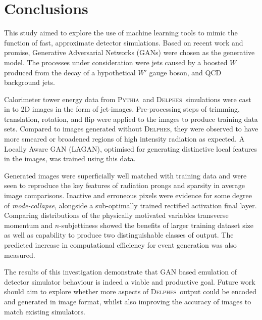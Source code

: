 \documentclass{report}
\newcommand{\pkg}[1]{\textsc{#1}}
\newcommand{\pythia}{\pkg{Pythia}}
\newcommand{\delphes}{\pkg{Delphes}}
\begin{document}
\chapter{Conclusions}
\label{sec:conclusions}
This study aimed to explore the use of machine learning tools to mimic the function of fast, approximate detector simulations. Based on recent work and promise, Generative Adversarial Networks (GANs) were chosen as the generative model. The processes under consideration were jets caused by a boosted $W$ produced from the decay of a hypothetical $W'$ gauge boson, and QCD background jets. 

Calorimeter tower energy data from \pythia~and \delphes~simulations were cast in to 2D images in the form of jet-images. Pre-processing steps of trimming, translation, rotation, and flip were applied to the images to produce training data sets. Compared to images generated without \delphes, they were observed to have more smeared or broadened regions of high intensity radiation as expected. A Locally Aware GAN (LAGAN), optimised for generating distinctive local features in the images, was trained using this data. 

Generated images were superficially well matched with training data and were seen to reproduce the key features of radiation prongs and sparsity in average image comparisons. Inactive and erroneous pixels were evidence for some degree of \textit{mode-collapse}, alongside a sub-optimally trained rectified activation final layer. Comparing distributions of the physically motivated variables transverse momentum and $n$-subjettiness showed the benefits of larger training dataset size as well as capability to produce two distinguishable classes of output. The predicted increase in computational efficiency for event generation was also measured. 

The results of this investigation demonstrate that GAN based emulation of detector simulator behaviour is indeed a viable and productive goal. Future work should aim to explore whether more aspects of \delphes~output could be encoded and generated in image format, whilst also improving the accuracy of images to match existing simulators. 
\printbibliography[title=References]

\begin{appendices}

\end{appendices}
\end{document}
